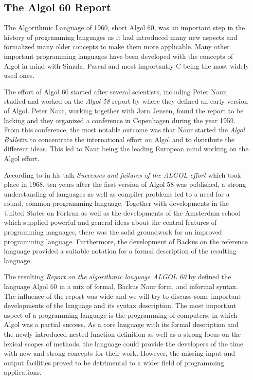 \documentclass{article}
\begin{document}
\subsection{The Algol 60 Report}

The Algorithmic Language of 1960, short Algol 60, was an important step in the history of programming languages as it had introduced many new aspects and formalized many older concepts to make them more applicable. Many other important programming languages have been developed with the concepts of Algol in mind with Simula, Pascal and most importantly C being the most widely used ones.

The effort of Algol 60 started after several scientists, including Peter Naur, studied and worked on the \textit{Algol 58} report by \citet{baueralgol} where they defined an early version of Algol. Peter Naur, working together with Jørn Jensen, found the report to be lacking and they organized a conference in Copenhagen during the year 1959. From this conference, the most notable outcome was that Naur started the \textit{Algol Bulletin} to concentrate the international effort on Algol and to distribute the different ideas. This led to Naur being the leading European mind working on the Algol effort.

According to \citet{naur1968successes} in his talk \textit{Successes and failures of the ALGOL effort} which took place in 1968, ten years after the first version of Algol 58 was published, a strong understanding of languages as well as compiler problems led to a need for a sound, common programming language. Together with developments in the United States on Fortran as well as the developments of the Amsterdam school which supplied powerful and general ideas about the central features of programming languages, there was the solid groundwork for an improved programming language. Furthermore, the development of Backus on the reference language provided a suitable notation for a formal description of the resulting language.

The resulting \textit{Report on the algorithmic language ALGOL 60} by \citet{backus1960report} defined the language Algol 60 in a mix of formal, Backus Naur form, and informal syntax. The influence of the report was wide and we will try to discuss some important developments of the language and its syntax description. The most important aspect of a programming language is the programming of computers, in which Algol was a partial success. As a core language with its formal description and the newly introduced nested function definition as well as a strong focus on the lexical scopes of methods, the language could provide the developers of the time with new and strong concepts for their work. However, the missing input and output facilities proved to be detrimental to a wider field of programming applications.
\end{document}
